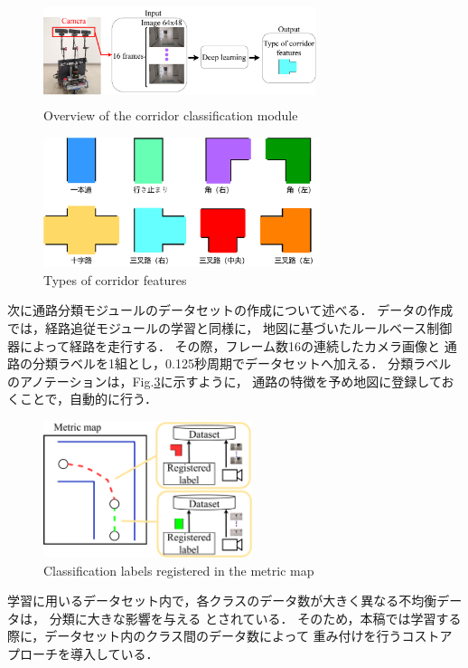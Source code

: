 \documentclass{sice-si}
\begin{document}
\begin{figure}[h!]
    \centering
     \includegraphics[height=30mm,width=80mm]{./figs/corridor_class.pdf}
     \caption{Overview of the corridor classification module}\label{fig:lrcn}
\end{figure}
\begin{figure}[h!]
    \centering
     \includegraphics[height=38mm]{./figs/corridor.pdf}
     \caption{Types of corridor features}\label{fig:intersection}
\end{figure}
\par
次に通路分類モジュールのデータセットの作成について述べる．
データの作成では，経路追従モジュールの学習と同様に，
地図に基づいたルールベース制御器によって経路を走行する．
その際，フレーム数16の連続したカメラ画像と
通路の分類ラベルを1組とし，0.125秒周期でデータセットへ加える．
分類ラベルのアノテーションは，Fig.\ref{fig:map2label}に示すように，
通路の特徴を予め地図に登録しておくことで，自動的に行う．
\begin{figure}[h!]
    \centering
     \includegraphics[height=40mm]{./figs/map_label.pdf}
     \caption{Classification labels registered in the metric map}\label{fig:map2label}
\end{figure}
\par
学習に用いるデータセット内で，各クラスのデータ数が大きく異なる不均衡データは，
分類に大きな影響を与える
\cite{hukin}
とされている．
そのため，本稿では学習する際に，データセット内のクラス間のデータ数によって
重み付けを行うコストアプローチ\cite{cost}を導入している．
\end{document}
